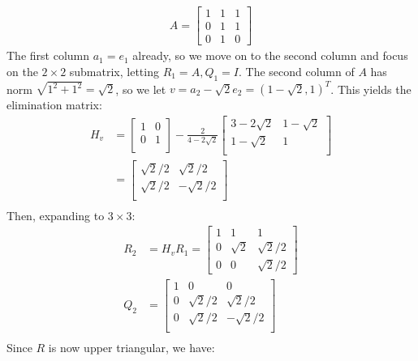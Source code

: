 \documentclass{article}
\begin{document}
\clearpage
\problem{}
\begin{align*}
    A = \begin{bmatrix}
        1 & 1 & 1 \\
        0 & 1 & 1 \\
        0 & 1 & 0
    \end{bmatrix}
\end{align*}
The first column $a_1 = e_1$ already, so we move on to the second column and focus on the $2 \times 2$ submatrix, letting $R_1 = A, Q_1 = I$. The second column of $A$ has norm $\sqrt{1^2 + 1^2} = \sqrt{2}$, so we let $v = a_2 - \sqrt{2}e_2 = {(1-\sqrt{2}, 1)}^T$. This yields the elimination matrix:
\begin{align*}
    H_v & = \begin{bmatrix}
        1 & 0 \\
        0 & 1 \\
    \end{bmatrix} - \frac{2}{4 - 2\sqrt{2}}\begin{bmatrix}
        3 - 2\sqrt{2} & 1 - \sqrt{2} \\
        1 - \sqrt{2} & 1 \\
    \end{bmatrix} \\
    & = \begin{bmatrix}
        \sqrt{2}/2 & \sqrt{2}/2 \\
        \sqrt{2}/2 & -\sqrt{2}/2 \\
    \end{bmatrix} \\
\end{align*}
Then, expanding to $3 \times 3$:
\begin{align*}
    R_2 & = H_v R_1 = \begin{bmatrix}
        1 & 1 & 1 \\
        0 & \sqrt{2} & \sqrt{2}/2 \\
        0 & 0 & \sqrt{2}/2
    \end{bmatrix}\\
    Q_2 & = \begin{bmatrix}
        1 & 0 & 0 \\
        0 & \sqrt{2}/2 & \sqrt{2}/2 \\
        0 & \sqrt{2}/2 & -\sqrt{2}/2 \\
    \end{bmatrix} \\
\end{align*}
Since $R$ is now upper triangular, we have:
\end{document}
